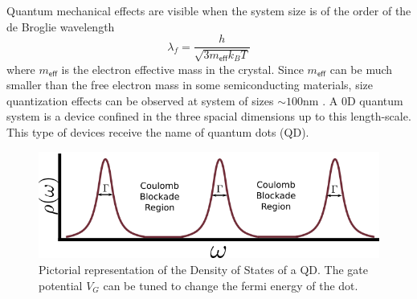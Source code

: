 Quantum mechanical effects are visible when the system size is of the order of the de Broglie wavelength \citep[(1.1)]{bimberg_quantum_1999}
\[
\lambda_{f}=\frac{h}{\sqrt{3m_{\mathsf{eff}}k_{B}T}}
\]
 where $m_{\mathsf{eff}}$ is the electron effective mass in the crystal.
Since $m_{\mathsf{eff}}$ can be much smaller than the free electron mass in some semiconducting materials, size quantization effects can be observed at system of sizes $\sim100\mbox{nm}$ \citep[2.1]{sindel_numerical_2005}. A $0$D quantum system is a device confined in the three spacial dimensions up to this length-scale. This type of devices receive the name of quantum dots (QD). 

\begin{figure}[tb]
    \centering
    \includegraphics[scale=0.5]{IMAGES/Preliminars/specDot.png}
    \caption{Pictorial representation of the Density of States of a QD. The gate potential $V_G$ can be tuned to change the fermi energy of the dot.  \protect{} }
    \label{fig:specDots}
\end{figure}


